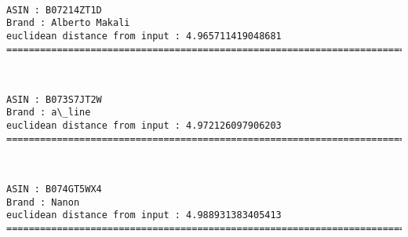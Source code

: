 \documentclass[11pt]{article}
\begin{document}
    
    
    \begin{center}
    \end{center}
    { \hspace*{\fill} \\}
    
    \begin{Verbatim}[commandchars=\\\{\}]
ASIN : B07214ZT1D
Brand : Alberto Makali
euclidean distance from input : 4.965711419048681
=============================================================================================================================

    \end{Verbatim}

    
    
    \begin{center}
    \end{center}
    { \hspace*{\fill} \\}
    
    \begin{Verbatim}[commandchars=\\\{\}]
ASIN : B073S7JT2W
Brand : a\_line
euclidean distance from input : 4.972126097906203
=============================================================================================================================

    \end{Verbatim}

    
    
    \begin{center}
    \end{center}
    { \hspace*{\fill} \\}
    
    \begin{Verbatim}[commandchars=\\\{\}]
ASIN : B074GT5WX4
Brand : Nanon
euclidean distance from input : 4.988931383405413
=============================================================================================================================

    \end{Verbatim}
\end{document}
